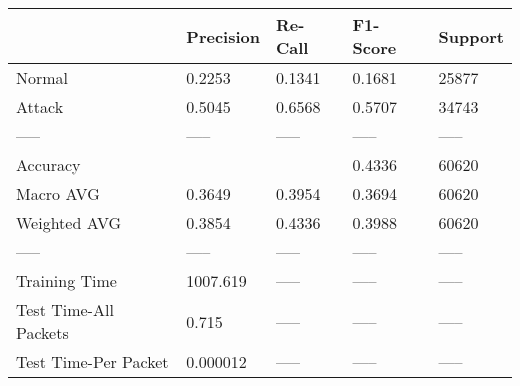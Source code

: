 \begin{tabular}{lllll}
\toprule
{} & Precision & Re-Call & F1-Score & Support \\
\midrule
Normal                &    0.2253 &  0.1341 &   0.1681 &   25877 \\
Attack                &    0.5045 &  0.6568 &   0.5707 &   34743 \\
-----                 &     ----- &   ----- &    ----- &   ----- \\
Accuracy              &           &         &   0.4336 &   60620 \\
Macro AVG             &    0.3649 &  0.3954 &   0.3694 &   60620 \\
Weighted AVG          &    0.3854 &  0.4336 &   0.3988 &   60620 \\
-----                 &     ----- &   ----- &    ----- &   ----- \\
Training Time         &  1007.619 &   ----- &    ----- &   ----- \\
Test Time-All Packets &     0.715 &   ----- &    ----- &   ----- \\
Test Time-Per Packet  &  0.000012 &   ----- &    ----- &   ----- \\
\bottomrule
\end{tabular}
